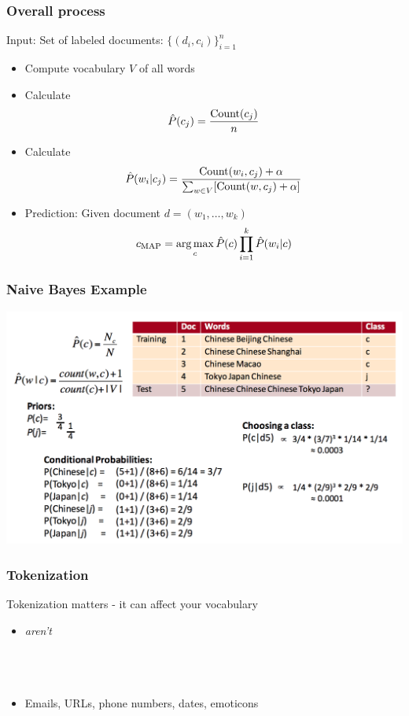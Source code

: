 \begin{frame}
\frametitle{Overall process}
Input: Set of labeled documents: $\{(d_i, c_i)\}_{i=1}^n$
\begin{itemize}[<+->]
\item Compute vocabulary $V$ of all words
\item Calculate \begin{equation*}\hat{P}(c_j) = \frac{\operatorname{Count}(c_j)}{n}\end{equation*}
\item Calculate \begin{equation*}\hat{P}(w_i | c_j) = \frac{\operatorname{Count}(w_i, c_j) + \alpha}{\sum_{w \in V}[\operatorname{Count}(w, c_j) + \alpha ]}\end{equation*}
\item Prediction: Given document $d = (w_1, \ldots, w_k)$
\begin{equation*}
c_{\text{MAP}} = \operatorname*{arg\,max}_{c} \hat{P}(c) \prod_{i=1}^{k} \hat{P}(w_i | c)
\end{equation*}
\end{itemize}
\end{frame}

\begin{frame}
\frametitle{Naive Bayes Example}
\includegraphics[scale=0.25]{figures/classifiers/nbexample.png}
\end{frame}

\begin{frame}
\frametitle{Tokenization}
\begin{block}{Tokenization matters - it can affect your vocabulary}
\begin{itemize}[<+->]
  \item {\em aren't}
     \\
     \\
      \\
      \\
  \item Emails, URLs, phone numbers, dates, emoticons 
\end{itemize}
\end{block}
\end{frame}

